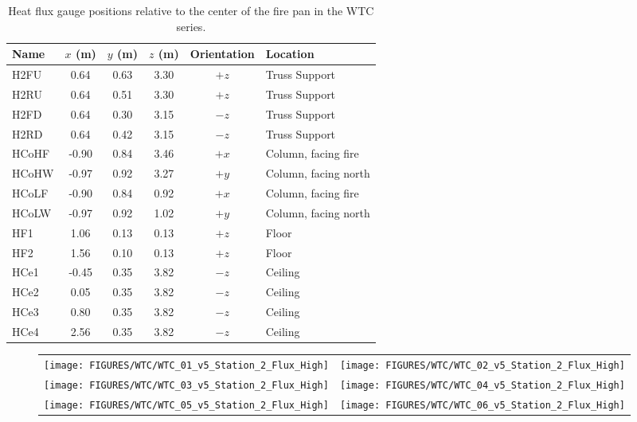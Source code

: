 \begin{table}[h!]
\caption{Heat flux gauge positions relative to the center of the fire pan in the WTC series.}
\begin{center}
\begin{tabular}{|l|c|c|c|c|l|}
\hline
Name    & $x$ (m)   & $y$ (m) & $z$ (m)   & Orientation  & Location  \\ \hline \hline
H2FU    & 0.64      & 0.63    & 3.30      &     $+z$     & Truss Support         \\ \hline
H2RU    & 0.64      & 0.51    & 3.30      &     $+z$     & Truss Support          \\ \hline
H2FD    & 0.64      & 0.30    & 3.15      &     $-z$     & Truss Support          \\ \hline
H2RD    & 0.64      & 0.42    & 3.15      &     $-z$     & Truss Support          \\ \hline
HCoHF   & -0.90     & 0.84    & 3.46      &     $+x$     & Column, facing fire          \\ \hline
HCoHW   & -0.97     & 0.92    & 3.27      &     $+y$     & Column, facing north          \\ \hline
HCoLF   & -0.90     & 0.84    & 0.92      &     $+x$     & Column, facing fire          \\ \hline
HCoLW   & -0.97     & 0.92    & 1.02      &     $+y$     & Column, facing north          \\ \hline
HF1     & 1.06      & 0.13    & 0.13      &     $+z$     & Floor          \\ \hline
HF2     & 1.56      & 0.10    & 0.13      &     $+z$     & Floor          \\ \hline
HCe1    & -0.45     & 0.35    & 3.82      &     $-z$     & Ceiling          \\ \hline
HCe2    &  0.05     & 0.35    & 3.82      &     $-z$     & Ceiling          \\ \hline
HCe3    &  0.80     & 0.35    & 3.82      &     $-z$     & Ceiling          \\ \hline
HCe4    &  2.56     & 0.35    & 3.82      &     $-z$     & Ceiling          \\ \hline
\end{tabular}
\end{center}
\label{WTC_Gauges}
\end{table}

\begin{figure}[p]
\begin{tabular*}{\textwidth}{l@{\extracolsep{\fill}}r}
\texttt{[image: FIGURES/WTC/WTC\_01\_v5\_Station\_2\_Flux\_High]} &
\texttt{[image: FIGURES/WTC/WTC\_02\_v5\_Station\_2\_Flux\_High]} \\
\texttt{[image: FIGURES/WTC/WTC\_03\_v5\_Station\_2\_Flux\_High]} &
\texttt{[image: FIGURES/WTC/WTC\_04\_v5\_Station\_2\_Flux\_High]} \\
\texttt{[image: FIGURES/WTC/WTC\_05\_v5\_Station\_2\_Flux\_High]} &
\texttt{[image: FIGURES/WTC/WTC\_06\_v5\_Station\_2\_Flux\_High]}
\end{tabular*}
\label{NIST_WTC_Station_2_Flux_High}
\end{figure}

